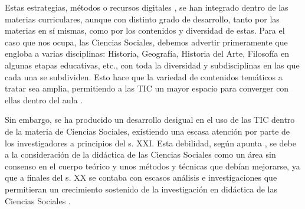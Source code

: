 \documentclass[spanish]{textolivre}
\begin{document}
Estas estrategias, métodos o recursos digitales \cite{colomo2023binstantaneas, colomomagana2023cpercepcion, lopez2023aaugmented, lopez2023bmetaverse, marin2021steam}, se han integrado dentro de las
materias curriculares, aunque con distinto grado de desarrollo, tanto por las materias en sí mismas, como por los contenidos y diversidad de estas. Para el caso que nos ocupa, las
Ciencias Sociales, debemos advertir primeramente que engloba a varias disciplinas: Historia, Geografía, Historia del Arte, Filosofía en algunas etapas educativas, etc., con toda la diversidad y subdisciplinas en las que cada una se subdividen. Esto hace que la variedad de contenidos temáticos a tratar sea amplia, permitiendo a las TIC un mayor espacio para converger con ellas dentro del aula \cite{araya2022didactica}.

Sin embargo, se ha producido un desarrollo desigual en el uso de las TIC dentro de la materia de Ciencias Sociales, existiendo una escasa atención por parte de los investigadores a principios del s. XXI. Esta debilidad, según apunta \textcite{gomez2019investigacion}, se debe a la consideración de la didáctica de las Ciencias Sociales como un área sin consenso en el cuerpo teórico y unos métodos y técnicas que debían mejorarse, ya que a finales del s. XX se contaba con escasos análisis e investigaciones que permitieran un crecimiento sostenido de la investigación en didáctica de las Ciencias Sociales \cite{prats2002hacia}.
\end{document}

